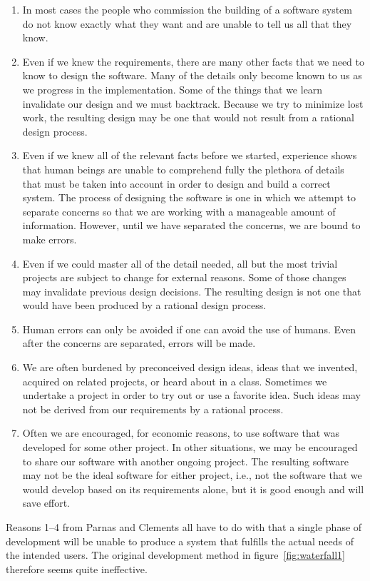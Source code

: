 \documentclass[a4paper]{report}
\begin{document}
\begin{enumerate}
	\item In most cases the people who commission the building of a software system do not know exactly what they want and are unable to tell us all that they know.
	\item Even if we knew the requirements, there are many other facts that we need to know to design the software. Many of the details only become known to us as we progress in the implementation. Some of the things that we learn invalidate our design and we must backtrack. Because we try to minimize lost work, the resulting design may be one that would not result from a rational design process.
	\item Even if we knew all of the relevant facts before we started, experience shows that human beings are unable to comprehend fully the plethora of details that must be taken into account in order to design and build a correct system. The process of designing the software is one in which we attempt to separate concerns so that we are working with a manageable amount of information. However, until we have separated the concerns, we are bound to make errors.
	\item Even if we could master all of the detail needed, all but the most trivial projects are subject to change for external reasons. Some of those changes may invalidate previous design decisions. The resulting design is not one that would have been produced by a rational design process.
	\item Human errors can only be avoided if one can avoid the use of humans. Even after the concerns are separated, errors will be made.
	\item We are often burdened by preconceived design ideas, ideas that we invented, acquired on related projects, or heard about in a class. Sometimes we undertake a project in order to try out or use a favorite idea. Such ideas may not be derived from our requirements by a rational process.
	\item Often we are encouraged, for economic reasons, to use software that was developed for some other project. In other situations, we may be encouraged to share our software with another ongoing project. The resulting software may not be the ideal software for either project, i.e., not the software that we would develop based on its requirements alone, but it is good enough and will save effort.
\end{enumerate}

Reasons 1--4 from Parnas and Clements all have to do with that a single phase of development will be unable to produce a system that fulfills the actual needs of the intended users. The original development method in figure~\ref{fig:waterfall1} therefore seems quite ineffective.
\end{document}
